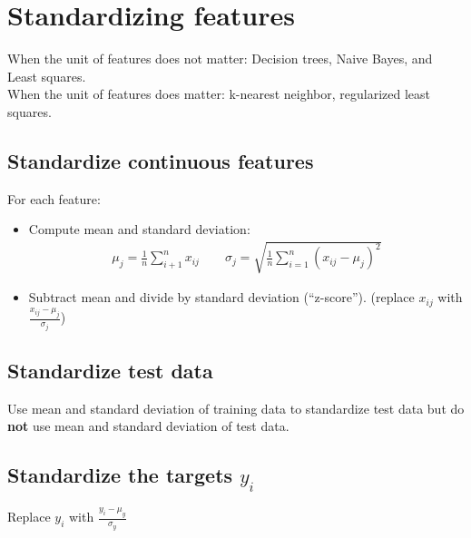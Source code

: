 \chapter{Standardizing features} %
When the unit of features does not matter: Decision trees, Naive Bayes, and Least squares.
\\When the unit of features does matter: k-nearest neighbor, regularized least squares.

\section{Standardize continuous features} \label{sec:}
\begin{idea}
    For each feature:
    \begin{itemize}
        \item Compute mean and standard deviation:
        \begin{align}
            \mu_j = \frac{1}{n} \sum\limits_{i+1}^{n} x_{ij} \qquad \sigma_j = \sqrt{\frac{1}{n} \sum\limits_{i=1}^{n} (x_{ij} - \mu_j)^{2}}
        \end{align}
        \item Subtract mean and divide by standard deviation (“z-score”). (replace $x_{ij}$ with $\frac{x_{ij}-\mu_j}{\sigma_j}$)
    \end{itemize}
\end{idea}

\section{Standardize test data} \label{sec:}

Use mean and standard deviation of training data to standardize test data but do \textbf{not} use mean and standard deviation of test data.

\section{Standardize the targets $y_i$} \label{sec:}
Replace $y_{i}$ with $\frac{y_{i}-\mu_y}{\sigma_y}$



